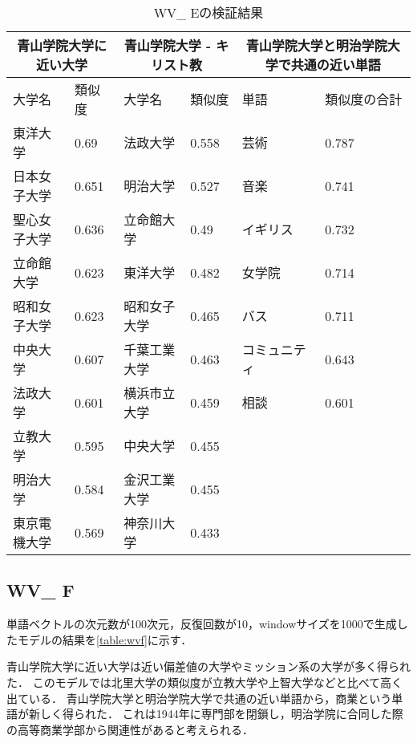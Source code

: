 \begin{table}[H]
\caption{WV\_ Eの検証結果}
\centering
\footnotesize
\begin{tabular}{ll|ll|ll}
\hline
\multicolumn{2}{c}{青山学院大学に近い大学} & \multicolumn{2}{c}{青山学院大学 - キリスト教} & \multicolumn{2}{c}{青山学院大学と明治学院大学で共通の近い単語}
\\ \hline
大学名 & 類似度 & 大学名 & 類似度 & 単語 & 類似度の合計
\\ \hline \hline
東洋大学 & 0.69 & 法政大学 & 0.558 & 芸術 & 0.787\\
日本女子大学 & 0.651 & 明治大学 & 0.527 & 音楽 & 0.741\\
聖心女子大学 & 0.636 & 立命館大学 & 0.49 & イギリス & 0.732\\
立命館大学 & 0.623 & 東洋大学 & 0.482 & 女学院 & 0.714\\
昭和女子大学 & 0.623 & 昭和女子大学 & 0.465 & バス & 0.711\\
中央大学 & 0.607 & 千葉工業大学 & 0.463 & コミュニティ & 0.643\\
法政大学 & 0.601 & 横浜市立大学 & 0.459 & 相談 & 0.601\\
立教大学 & 0.595 & 中央大学 & 0.455 & & \\
明治大学 & 0.584 & 金沢工業大学 & 0.455 & & \\
東京電機大学 & 0.569 & 神奈川大学 & 0.433 & & \\ \hline
\end{tabular}
\label{table:wve}
\end{table}

\subsection{WV\_ F}
単語ベクトルの次元数が100次元，反復回数が10，windowサイズを1000で生成したモデルの結果を\ref{table:wvf}に示す．

青山学院大学に近い大学は近い偏差値の大学やミッション系の大学が多く得られた．
このモデルでは北里大学の類似度が立教大学や上智大学などと比べて高く出ている．
青山学院大学と明治学院大学で共通の近い単語から，商業という単語が新しく得られた．
これは1944年に専門部を閉鎖し，明治学院に合同した際の高等商業学部から関連性があると考えられる．

